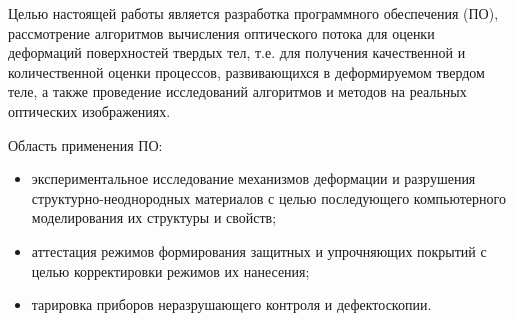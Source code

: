 Целью настоящей работы является разработка программного обеспечения (ПО), рассмотрение алгоритмов вычисления оптического потока для оценки деформаций поверхностей твердых тел, т.е. для получения качественной и количественной оценки процессов, развивающихся в деформируемом твердом теле, а также проведение исследований алгоритмов и методов на реальных оптических изображениях.

Область применения ПО:
\begin{itemize}
\item экспериментальное исследование механизмов деформации и разрушения структурно-неоднородных материалов с целью последующего компьютерного моделирования их структуры и свойств;
\item аттестация режимов формирования защитных и упрочняющих покрытий с целью корректировки режимов их нанесения;
\item тарировка приборов неразрушающего контроля и дефектоскопии.
\end{itemize}

